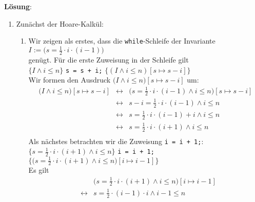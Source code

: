 \documentclass{article}
\renewcommand{\labelenumii}{\arabic{enumii}.}
\begin{document}
\noindent
\textbf{L\"osung}:
\begin{enumerate}
\item Zun\"achst der Hoare-Kalk\"ul:
\begin{enumerate}
      \renewcommand{\labelenumii}{\arabic{enumii}.}
\item Wir zeigen als erstes, dass die \texttt{while}-Schleife der Invariante 
      \\[0.2cm]
      \hspace*{1.3cm}
      $I := \bigl(s = \frac{1}{2} \cdot i \cdot (i - 1)\bigr)$ 
      \\[0.2cm]
      gen\"ugt.  
      F\"ur die erste Zuweisung in der Schleife gilt
      \\[0.2cm]
      \hspace*{1.3cm}
      $\{ I \wedge i \leq n \}$ \quad \texttt{s = s + i;} \quad $\{ (I \wedge i \leq n)[s \mapsto s - i] \}$
      \\[0.2cm]
      Wir formen den Ausdruck $\bigl(I \wedge i \leq n\bigr)[s \mapsto s - i]$ um:
      \begin{eqnarray*}
        \bigl(I \wedge i \leq n\bigr)[s \mapsto s - i] 
        & \leftrightarrow & \bigl(s = \frac{1}{2} \cdot i \cdot (i-1) \wedge i \leq n\bigr)[s \mapsto s - i] \\
        & \leftrightarrow & s - i = \frac{1}{2} \cdot i \cdot (i-1) \wedge i \leq n \\
        & \leftrightarrow & s = \frac{1}{2} \cdot i \cdot (i-1) + i \wedge i \leq n \\
        & \leftrightarrow & s = \frac{1}{2} \cdot i \cdot (i+1) \wedge i \leq n \\
      \end{eqnarray*}
      Als n\"achstes betrachten wir die Zuweisung \texttt{i = i + 1;}:
      \\[0.2cm]
      \hspace*{1.3cm}
      $\{ s = \frac{1}{2} \cdot i \cdot (i+1) \wedge i \leq n \}$ \quad \texttt{i = i + 1;} \quad
      $\{ \bigl(s = \frac{1}{2} \cdot i \cdot (i+1)\wedge i \leq n\bigr)[i \mapsto i - 1] \}$ 
      \\[0.2cm]
      Es gilt 
      \begin{eqnarray*}        
      &                 & \bigl(s = \frac{1}{2} \cdot i \cdot (i+1)\wedge i \leq n\bigr)[i \mapsto i - 1] \\
      & \leftrightarrow & s = \frac{1}{2} \cdot (i-1) \cdot i \wedge i - 1 \leq n                         \\

\end{eqnarray*}
\end{enumerate}
\end{enumerate}
\end{document}
